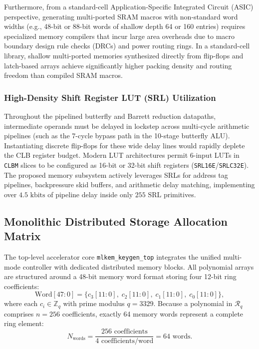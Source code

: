 Furthermore, from a standard-cell Application-Specific Integrated Circuit (ASIC) perspective, generating multi-ported SRAM macros with non-standard word widths (e.g., 48-bit or 88-bit words of shallow depth 64 or 160 entries) requires specialized memory compilers that incur large area overheads due to macro boundary design rule checks (DRCs) and power routing rings. In a standard-cell library, shallow multi-ported memories synthesized directly from flip-flops and latch-based arrays achieve significantly higher packing density and routing freedom than compiled SRAM macros.

\subsubsection{High-Density Shift Register LUT (SRL) Utilization}
Throughout the pipelined butterfly and Barrett reduction datapaths, intermediate operands must be delayed in lockstep across multi-cycle arithmetic pipelines (such as the 7-cycle bypass path in the 10-stage butterfly ALU). Instantiating discrete flip-flops for these wide delay lines would rapidly deplete the CLB register budget. Modern LUT architectures permit 6-input LUTs in \texttt{CLBM} slices to be configured as 16-bit or 32-bit shift registers (\texttt{SRL16E}/\texttt{SRLC32E}). The proposed memory subsystem actively leverages SRLs for address tag pipelines, backpressure skid buffers, and arithmetic delay matching, implementing over $4.5\text{ kbits}$ of pipeline delay inside only $255\text{ SRL}$ primitives.

\subsection{Monolithic Distributed Storage Allocation Matrix}
\label{sec:mem_allocation}

The top-level accelerator core \texttt{mlkem\_keygen\_top} integrates the unified multi-mode controller with dedicated distributed memory blocks. All polynomial arrays are structured around a 48-bit memory word format storing four 12-bit ring coefficients:
\begin{equation}
\label{eq:mem_word_format}
\text{Word}[47:0] = \{c_3[11:0], \; c_2[11:0], \; c_1[11:0], \; c_0[11:0]\},
\end{equation}
where each $c_i \in \mathbb{Z}_q$ with prime modulus $q = 3329$. Because a polynomial in $\mathcal{R}_q$ comprises $n = 256$ coefficients, exactly 64 memory words represent a complete ring element:
\begin{equation}
\label{eq:words_per_poly}
N_{\text{words}} = \frac{256 \text{ coefficients}}{4 \text{ coefficients/word}} = 64 \text{ words}.
\end{equation}

